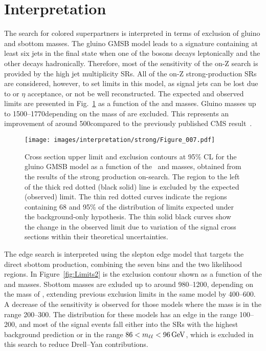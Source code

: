 \section{Interpretation}
\noindent
\justify
The search for colored superpartners is interpreted in terms of exclusion of gluino and sbottom masses. 
The gluino GMSB model leads to a signature containing at least six jets in the final state when one of the \PZ bosons decays leptonically and the other decays hadronically.  
Therefore, most of the sensitivity of the on-Z search is provided by the high jet multiplicity SRs.
All of the on-Z strong-production SRs are considered, however, to set limits in this model, as signal jets can be lost due to \pt or $\eta$ acceptance, or not be well reconstructed.
The expected and observed limits are presented in Fig.~\ref{fig:Limits1} as a function of the \gluino  and \firstchi masses.
Gluino masses up to 1500--1770\GeV depending on the mass of \firstchi are excluded.
This represents an improvement of around 500\GeV compared to the previously published CMS result~\cite{CMS:Zedge2015}.
\begin{figure}[!hb]
 \centering
   \texttt{[image: images/interpretation/strong/Figure\_007.pdf]}
   \caption{\label{fig:Limits1}
     Cross section upper limit and exclusion contours at 95\% CL for the gluino GMSB model as a function of the \gluino~and \firstchi masses,
     obtained from the results of the strong production on-\PZ search.
     The region to the left of the thick red dotted (black solid) line is excluded by the expected (observed) limit.
     The thin red dotted curves indicate the regions containing 68 and 95\% of the distribution of limits
     expected under the background-only hypothesis.
     The thin solid black curves show the change in the observed limit due to
     variation of the signal cross sections within their theoretical uncertainties.
   }
\end{figure}
The edge search is interpreted using the slepton edge model that targets the direct sbottom production, combining the seven \mll bins and the two \ttbar likelihood regions.
In Figure~\ref{fig:Limits2} is the exclusion contour shown as a function of the \sbottom and \secondchi masses. 
Sbottom masses are exluded up to around 980--1200\GeV, depending on the mass of \secondchi, extending previous exclusion limits in the same model by 400--600\GeV.
A decrease of the sensitivity is observed for those models where the \secondchi mass is in the range 200--300\GeV.
The \mll distribution for these models has an edge in the range 100--200\GeV, and most of the signal events fall either into the SRs with the highest background prediction or in the range $86 < m_{\ell\ell} < 96\,\text{Ge\hspace{-.08em}V}$, which is excluded in this search to reduce Drell--Yan contributions.
